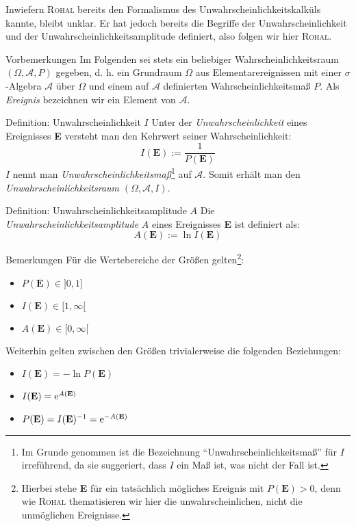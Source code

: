 Inwiefern \textsc{Rohal} bereits den Formalismus des Unwahrscheinlichkeitskalküls kannte, bleibt unklar. Er hat jedoch bereits die Begriffe der Unwahrscheinlichkeit und der Unwahrscheinlichkeitsamplitude definiert, also folgen wir hier \textsc{Rohal}.
\begin{bla}{Vorbemerkungen}
Im Folgenden sei stets ein beliebiger Wahrscheinlichkeitsraum $(\Omega,\mathcal{A},P)$ gegeben, d. h. ein Grundraum $\Omega$ aus Elementarereignissen mit einer $\sigma$-Algebra $\mathcal{A}$ über $\Omega$ und einem auf $\mathcal{A}$ definierten Wahrscheinlichkeitsmaß $P$. Als \emph{Ereignis} bezeichnen wir ein Element von $\mathcal{A}$.
\end{bla}
\begin{bla}{Definition: Unwahrscheinlichkeit $I$}
Unter der \emph{Unwahrscheinlichkeit} eines Ereignisses \textbf{E} versteht man den Kehrwert seiner Wahrscheinlichkeit:\\
\begin{equation}
I(\textbf{E}) := \frac{1}{P(\textbf{E})}
\end{equation}
$I$ nennt man \emph{Unwahrscheinlichkeitsmaß}\footnote{Im Grunde genommen ist die Bezeichnung "`Unwahrscheinlichkeitsmaß"' für $I$ irreführend, da sie suggeriert, dass $I$ ein Maß ist, was nicht der Fall ist.} auf $\mathcal{A}$. Somit erhält man den \emph{Unwahrscheinlichkeitsraum} $(\Omega,\mathcal{A},I)$.
\end{bla}
\clearpage
\begin{bla}{Definition: Unwahrscheinlichkeitsamplitude $A$}
Die \emph{Unwahrscheinlichkeitsamplitude} $A$ eines Ereignisses \textbf{E} ist definiert als:
\begin{equation}
A(\textbf{E}) := \ln{I(\textbf{E})}
\end{equation}
\end{bla}
\begin{bla}{Bemerkungen}
Für die Wertebereiche der Größen gelten\footnote{Hierbei stehe \textbf{E} für ein tatsächlich mögliches Ereignis mit $P(\textbf{E}) > 0$, denn wie \textsc{Rohal} thematisieren wir hier die unwahrscheinlichen, nicht die unmöglichen Ereignisse.}:
\begin{itemize}
\item $P(\textbf{E}) \in ]0,1]$
\item $I(\textbf{E}) \in [1,\infty[$
\item $A(\textbf{E}) \in [0,\infty[$
\end{itemize}
Weiterhin gelten zwischen den Größen trivialerweise die folgenden Beziehungen:
\begin{itemize}
\item $I(\textbf{E}) = - \ln P(\textbf{E})$
\item $I(\textbf{E}) = \text{\rmfamily e} ^ {A(\textbf{E})}$
\item $P(\textbf{E}) = I(\textbf{E}) ^{-1} = \text{\rmfamily e} ^{-A(\textbf{E})}$
\end{itemize}
\end{bla}
